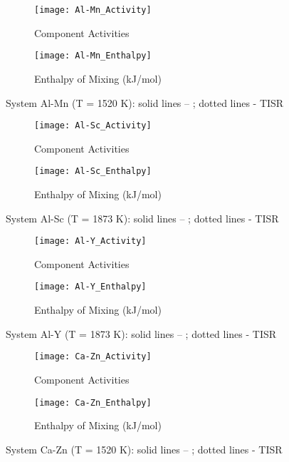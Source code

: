 \documentclass[12pt,abstract]{scrartcl}
\begin{document}
\begin{figure}
\centering
\begin{subfigure}{.5\textwidth}
  \centering
  \texttt{[image: Al-Mn\_Activity]}
  \caption{Component Activities}
  \label{fig:sub1}
\end{subfigure}%
\begin{subfigure}{.5\textwidth}
  \centering
  \texttt{[image: Al-Mn\_Enthalpy]}
  \caption{Enthalpy of Mixing (kJ/mol)}
  \label{fig:sub2}
\end{subfigure}
\caption{System Al-Mn (T = 1520 K): solid lines -- \cite{Al-Mn_Data}; dotted lines - TISR}
\label{fig:Al-Mn}
\end{figure}


\begin{figure}
\centering
\begin{subfigure}{.5\textwidth}
  \centering
  \texttt{[image: Al-Sc\_Activity]}
  \caption{Component Activities}
  \label{fig:sub1}
\end{subfigure}%
\begin{subfigure}{.5\textwidth}
  \centering
  \texttt{[image: Al-Sc\_Enthalpy]}
  \caption{Enthalpy of Mixing (kJ/mol)}
  \label{fig:sub2}
\end{subfigure}
\caption{System Al-Sc (T = 1873 K): solid lines -- \cite{Al-Sc_Data}; dotted lines - TISR}
\label{fig:Al-Sc}
\end{figure}

\begin{figure}
\centering
\begin{subfigure}{.5\textwidth}
  \centering
  \texttt{[image: Al-Y\_Activity]}
  \caption{Component Activities}
  \label{fig:sub1}
\end{subfigure}%
\begin{subfigure}{.5\textwidth}
  \centering
  \texttt{[image: Al-Y\_Enthalpy]}
  \caption{Enthalpy of Mixing (kJ/mol)}
  \label{fig:sub2}
\end{subfigure}
\caption{System Al-Y (T = 1873 K): solid lines -- \cite{Al-Sc_Data}; dotted lines - TISR}
\label{fig:Al-Y}
\end{figure}

\begin{figure}
\centering
\begin{subfigure}{.5\textwidth}
  \centering
  \texttt{[image: Ca-Zn\_Activity]}
  \caption{Component Activities}
  \label{fig:sub1}
\end{subfigure}%
\begin{subfigure}{.5\textwidth}
  \centering
  \texttt{[image: Ca-Zn\_Enthalpy]}
  \caption{Enthalpy of Mixing (kJ/mol)}
  \label{fig:sub2}
\end{subfigure}
\caption{System Ca-Zn (T = 1520 K): solid lines -- \cite{Ca-Zn_Data}; dotted lines - TISR}
\label{fig:Ca-Zn}
\end{figure}
\end{document}
